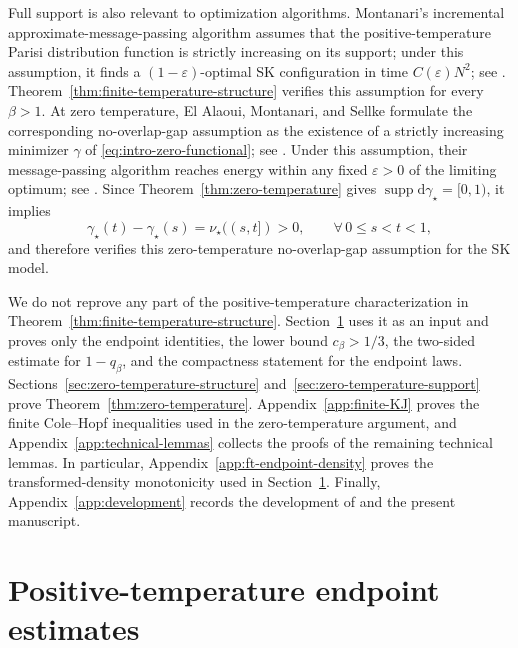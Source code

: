 \documentclass[10pt]{amsart}
\theoremstyle{definition}
\theoremstyle{remark}
\numberwithin{equation}{section}
\newcommand{\1}{\mathbf 1}
\newcommand{\supp}{\operatorname{supp}}
\begin{document}
Full support is also relevant to optimization algorithms. Montanari's incremental approximate-message-passing algorithm assumes that the positive-temperature Parisi distribution function is strictly increasing on its support; under this assumption, it finds a $(1-\varepsilon)$-optimal SK configuration in time $C(\varepsilon)N^2$; see \cite[Assumption~1 and Theorem~2]{MontanariSKOptimization}. Theorem~\ref{thm:finite-temperature-structure} verifies this assumption for every $\beta>1$. At zero temperature, El Alaoui, Montanari, and Sellke formulate the corresponding no-overlap-gap assumption as the existence of a strictly increasing minimizer $\gamma$ of \eqref{eq:intro-zero-functional}; see \cite[Assumption~2]{ElAlaouiMontanariSellke}. Under this assumption, their message-passing algorithm reaches energy within any fixed $\varepsilon>0$ of the limiting optimum; see \cite[Corollary~2.2]{ElAlaouiMontanariSellke}. Since Theorem~\ref{thm:zero-temperature} gives $\supp\mathrm d\gamma_\star=[0,1)$, it implies
\begin{equation*}
 \gamma_\star(t)-\gamma_\star(s)
 =\nu_\star((s,t])>0,
 \qquad \forall\,0\leq s<t<1,
\end{equation*}
and therefore verifies this zero-temperature no-overlap-gap assumption for the SK model.

We do not reprove any part of the positive-temperature characterization in Theorem~\ref{thm:finite-temperature-structure}. Section~\ref{sec:finite-temperature-proof} uses it as an input and proves only the endpoint identities, the lower bound $c_\beta>1/3$, the two-sided estimate for $1-q_\beta$, and the compactness statement for the endpoint laws. Sections~\ref{sec:zero-temperature-structure} and~\ref{sec:zero-temperature-support} prove Theorem~\ref{thm:zero-temperature}. Appendix~\ref{app:finite-KJ} proves the finite Cole--Hopf inequalities used in the zero-temperature argument, and Appendix~\ref{app:technical-lemmas} collects the proofs of the remaining technical lemmas. In particular, Appendix~\ref{app:ft-endpoint-density} proves the transformed-density monotonicity used in Section~\ref{sec:finite-temperature-proof}. Finally, Appendix~\ref{app:development} records the development of \cite{AIxivPreprint} and the present manuscript.



\section{Positive-temperature endpoint estimates}
\label{sec:finite-temperature-proof}
\end{document}
